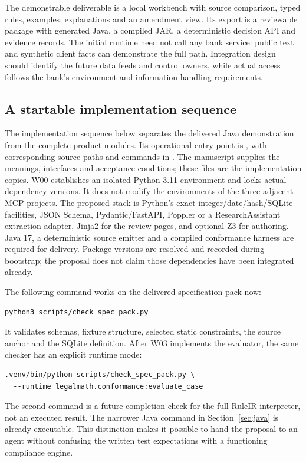 The demonstrable deliverable is a local workbench with source comparison, typed
rules, examples, explanations and an amendment view. Its export is a reviewable
package with generated Java, a compiled JAR, a deterministic decision API and
evidence records. The initial runtime need not call any bank service: public text and synthetic client facts
can demonstrate the full path. Integration design should identify the future
data feeds and control owners, while actual access follows the bank's environment
and information-handling requirements.

\subsection{A startable implementation sequence}

The implementation sequence below separates the delivered Java demonstration
from the complete product modules. Its operational entry point is
, with corresponding source paths and
commands in . The manuscript supplies the meanings,
interfaces and acceptance conditions; these files are the implementation copies.
W00 establishes an isolated
Python 3.11 environment and locks actual dependency versions. It does not modify
the environments of the three adjacent MCP projects. The proposed stack is
Python's exact integer/date/hash/SQLite facilities, JSON Schema, Pydantic/FastAPI,
Poppler or a ResearchAssistant extraction adapter, Jinja2 for the review pages,
and optional Z3 for authoring. Java 17, a deterministic source emitter and a
compiled conformance harness are required for delivery. Package versions are resolved and recorded during bootstrap;
the proposal does not claim those dependencies have been integrated already.

The following command works on the delivered specification pack now:
\begin{lstlisting}
python3 scripts/check_spec_pack.py
\end{lstlisting}
It validates schemas, fixture structure, selected static constraints, the source
anchor and the SQLite definition. After W03 implements the evaluator, the same
checker has an explicit runtime mode:
\begin{lstlisting}
.venv/bin/python scripts/check_spec_pack.py \
  --runtime legalmath.conformance:evaluate_case
\end{lstlisting}
The second command is a future completion check for the full RuleIR interpreter,
not an executed result. The narrower Java command in Section~\ref{sec:java}
is already executable. This
distinction makes it possible to hand the proposal to an agent without confusing
the written test expectations with a functioning compliance engine.

